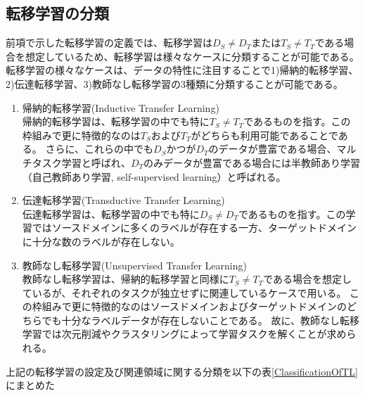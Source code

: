 \subsection{転移学習の分類}
    前項で示した転移学習の定義では、転移学習は$D_S \neq D_T$または$T_S \neq T_T$である場合を想定しているため、転移学習は様々なケースに分類することが可能である。
    転移学習の様々なケースは、データの特性に注目することで1)帰納的転移学習、2)伝達転移学習、3)教師なし転移学習の3種類に分類することが可能である。
    \begin{enumerate}
        \item 帰納的転移学習(Inductive Transfer Learning)\\
            帰納的転移学習は、転移学習の中でも特に$T_S \neq T_T$であるものを指す。この枠組みで更に特徴的なのは$T_S$および$T_T$がどちらも利用可能であることである。
            さらに、これらの中でも$D_S$かつが$D_T$のデータが豊富である場合、マルチタスク学習と呼ばれ、$D_T$のみデータが豊富である場合には半教師あり学習（自己教師あり学習, self-supervised learning）と呼ばれる。
        \item 伝達転移学習(Transductive Transfer Learning)\\
            伝達転移学習は、転移学習の中でも特に$D_S \neq D_T$であるものを指す。この学習ではソースドメインに多くのラベルが存在する一方、ターゲットドメインに十分な数のラベルが存在しない。
        \item 教師なし転移学習(Unsupervised Transfer Learning)\\
            教師なし転移学習は、帰納的転移学習と同様に$T_S \neq T_T$である場合を想定しているが、それぞれのタスクが独立せずに関連しているケースで用いる。
            この枠組みで更に特徴的なのはソースドメインおよびターゲットドメインのどちらでも十分なラベルデータが存在しないことである。
            故に、教師なし転移学習では次元削減やクラスタリングによって学習タスクを解くことが求められる。
    \end{enumerate}
    上記の転移学習の設定及び関連領域に関する分類を以下の表\ref{ClassificationOfTL}にまとめた

